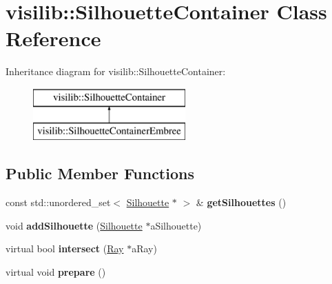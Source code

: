\hypertarget{classvisilib_1_1_silhouette_container}{}\section{visilib\+::Silhouette\+Container Class Reference}
\label{classvisilib_1_1_silhouette_container}
Inheritance diagram for visilib\+::Silhouette\+Container\+:\begin{figure}[H]
\begin{center}
\leavevmode
\includegraphics[height=2.000000cm]{classvisilib_1_1_silhouette_container}
\end{center}
\end{figure}
\subsection*{Public Member Functions}
\begin{DoxyCompactItemize}
\item 
\mbox{\label{classvisilib_1_1_silhouette_container_a7c42eff193b69bd62532c1b723700901}} 
const std\+::unordered\+\_\+set$<$ \mbox{\hyperlink{classvisilib_1_1_silhouette}{Silhouette}} $\ast$ $>$ \& {\bfseries get\+Silhouettes} ()
\item 
\mbox{\label{classvisilib_1_1_silhouette_container_a5a9047d08292878caf0d4cea6107122f}} 
void {\bfseries add\+Silhouette} (\mbox{\hyperlink{classvisilib_1_1_silhouette}{Silhouette}} $\ast$a\+Silhouette)
\item 
\mbox{\label{classvisilib_1_1_silhouette_container_a45fe6f13c65d91a7f500bb47f3a6cb34}} 
virtual bool {\bfseries intersect} (\mbox{\hyperlink{structvisilib_1_1_ray}{Ray}} $\ast$a\+Ray)
\item 
\mbox{\label{classvisilib_1_1_silhouette_container_a83c0a6a3517e09446d8f145a3f58eda7}} 
virtual void {\bfseries prepare} ()
\end{DoxyCompactItemize}
